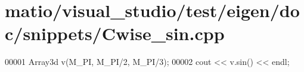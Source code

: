 \hypertarget{matio_2visual__studio_2test_2eigen_2doc_2snippets_2_cwise__sin_8cpp_source}{}\section{matio/visual\+\_\+studio/test/eigen/doc/snippets/\+Cwise\+\_\+sin.cpp}
\label{matio_2visual__studio_2test_2eigen_2doc_2snippets_2_cwise__sin_8cpp_source}

\begin{DoxyCode}
00001 Array3d v(M\_PI, M\_PI/2, M\_PI/3);
00002 cout << v.sin() << endl;
\end{DoxyCode}
